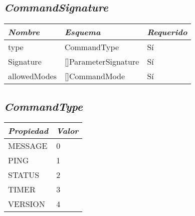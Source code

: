\subsection{\textit{CommandSignature}}
\begin{table}[H]
    \centering
    \def\arraystretch{1.25}
    \begin{adjustbox}{max width=\textwidth}
    \begin{tabularx}{\textwidth}{|L|l|l|}
    \hline
        \textbf{\textit{Nombre}} & \textbf{\textit{Esquema}} & \textbf{\textit{Requerido}} \\ \hline
    \hline
        type & CommandType & Sí \\ \hline
        Signature & []ParameterSignature & Sí \\ \hline
        allowedModes & []CommandMode & Sí \\ \hline
    \end{tabularx}
    \end{adjustbox}
\end{table}

\subsection{\textit{CommandType}}
\begin{table}[H]
    \centering
    \def\arraystretch{1.25}
    \begin{adjustbox}{max width=\textwidth}
    \begin{tabularx}{\textwidth}{|L|l|}
    \hline
        \textbf{\textit{Propiedad}} & \textbf{\textit{Valor}} \\ \hline
    \hline
        MESSAGE & 0 \\ \hline
        PING & 1 \\ \hline
        STATUS & 2 \\ \hline
        TIMER & 3 \\ \hline
        VERSION & 4 \\ \hline
    \end{tabularx}
    \end{adjustbox}
\end{table}

